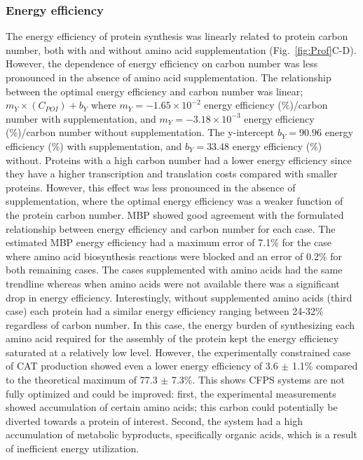 \documentclass[journal=asbcd6,manuscript=article]{achemso}
\begin{document}
\subsubsection{Energy efficiency}
The energy efficiency of protein synthesis was linearly related to protein carbon number, both with and without amino acid supplementation (Fig.~\ref{fig:Prof}C-D).
However, the dependence of energy efficiency on carbon number was less pronounced in the absence of amino acid supplementation.
The relationship between the optimal energy efficiency and carbon number was linear; $m_{Y}\times(C_{POI})+b_{Y}$ where $m_{Y} =  -1.65\times10^{-2}$ energy efficiency (\%)/carbon number with supplementation,
and $m_{Y} = -3.18\times10^{-3}$ energy efficiency (\%)/carbon number without supplementation.
The y-intercept $b_{Y} = 90.96$ energy efficiency (\%) with supplementation, and $b_{Y} = 33.48$ energy efficiency (\%) without.
Proteins with a high carbon number had a lower energy efficiency since they have a higher transcription and translation costs compared with smaller proteins.
However, this effect was less pronounced in the absence of supplementation, where the optimal energy efficiency was a weaker function of the protein carbon number.
MBP showed good agreement with the formulated relationship between energy efficiency and carbon number for each case.
The estimated MBP energy efficiency had a maximum error of 7.1\% for the case where amino acid biosynthesis reactions were blocked and an error of 0.2\% for both remaining cases.
The cases supplemented with amino acids had the same trendline whereas when amino acids were not available there was a significant drop in energy efficiency.
Interestingly, without supplemented amino acids (third case) each protein had a similar energy efficiency ranging between 24-32\% regardless of carbon number.
In this case, the energy burden of synthesizing each amino acid required for the assembly of the protein kept the energy efficiency saturated at a relatively low level.
However, the experimentally constrained case of CAT production showed even a lower energy efficiency of 3.6 $\pm$ 1.1\% compared to the theoretical maximum of 77.3 $\pm$ 7.3\%.
This shows CFPS systems are not fully optimized and could be improved: first, the experimental measurements showed accumulation of certain amino acids; this carbon could potentially be diverted towards a protein of interest.
Second, the system had a high accumulation of metabolic byproducts, specifically organic acids, which is a result of inefficient energy utilization.
\end{document}
